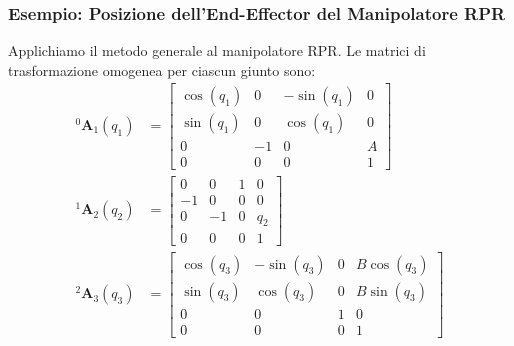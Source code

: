 \documentclass[11pt, a4paper]{report}
\begin{document}
\newpage


\subsubsection*{Esempio: Posizione dell'End-Effector del Manipolatore RPR}

Applichiamo il metodo generale al manipolatore RPR. Le matrici di trasformazione omogenea per ciascun giunto sono:
\begin{align*}
    ^{0}\bm{A}_{1}(q_{1}) &=
    \begin{bmatrix}
        \cos(q_{1}) & 0 & -\sin(q_{1}) & 0\\
        \sin(q_{1}) & 0 & \cos(q_{1}) & 0\\
        0 & -1 & 0 & A\\
        0 & 0 & 0 & 1
    \end{bmatrix} \\
    ^{1}\bm{A}_{2}(q_{2}) &=
    \begin{bmatrix}
        0 & 0 & 1 & 0\\
        -1 & 0 & 0 & 0\\
        0 & -1 & 0 & q_{2}\\
        0 & 0 & 0 & 1
    \end{bmatrix} \\
    ^{2}\bm{A}_{3}(q_{3}) &=
    \begin{bmatrix}
        \cos(q_{3}) & -\sin(q_{3}) & 0 & B\cos(q_{3})\\
        \sin(q_{3}) & \cos(q_{3}) & 0 & B\sin(q_{3})\\
        0 & 0 & 1 & 0\\
        0 & 0 & 0 & 1
    \end{bmatrix}
\end{align*}
\end{document}
